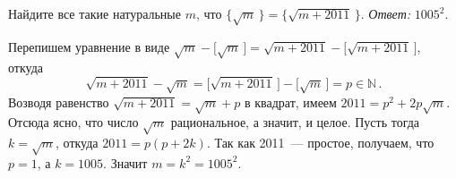 \problem
Найдите все такие натуральные $m$, что
\(
    \bigl\{ \sqrt{m} \, \bigr\}
=
    \bigl\{ \sqrt{m+2011} \, \bigr\}
\).
\solution
\emph{Ответ:} $1005^2$.
\par
Перепишем уравнение в виде
\(
    \sqrt{m} - \bigl[ \sqrt{m} \, \bigr]
=
    \sqrt{m + 2011} - \bigl[ \sqrt{m + 2011} \, \bigr]
\),
откуда
\[
    \sqrt{m + 2011} - \sqrt{m}
=
    \bigl[ \sqrt{m + 2011} \, \bigr] - \bigl[ \sqrt{m} \, \bigr]
=
    p \in \mathbb{N}
\, . \]
Возводя равенство $\sqrt{m + 2011} = \sqrt{m} + p$ в квадрат, имеем
$2011 = p^2 + 2 p \sqrt{m}$.
Отсюда ясно, что число $\sqrt{m}$ рациональное, а значит, и целое.
Пусть тогда $k = \sqrt{m}$, откуда $2011 = p (p + 2 k)$.
Так как 2011~--- простое, получаем, что $p=1$, а $k = 1005$.
Значит $m = k^2 = 1005^2$.
\endproblem
